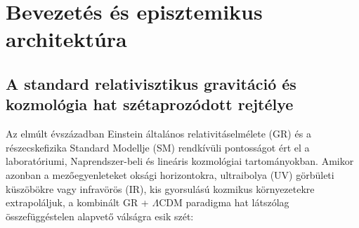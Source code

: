 \documentclass[11pt,a4paper]{article}
\theoremstyle{remark}
\begin{document}
\begin{abstract}
\textbf{(D5)} A lok\'alis $S_4(\sigma)\times S_4(\sigma')$ lap-m\'ert\'ekz\'ar az $\ell_* = \sqrt{24\pi}\,\ell_P$ szimplici\'alis v\'ag\'as\'u horizontra korl\'atozza a direktor-m\'odusokat, $S_H/k_B = 6\pi(A_H/\ell_*^2)$ ($18.85\,k_B$/plakett) entr\'opi\'at, $r_+ = 3\ell_*$-n\'el tet\H{o}z\H{o} ($T_{H,\max} = 2.89 \times 10^{29}\;\mathrm{K}$), majd $C_{\mathrm{BH}} > 0$ pozit\'iv h\H{o}kapacit\'assal $T_H = 0\;\mathrm{K}$-ig h\H{u}l\H{o} extrem\'alis $K_4$ cs\'ira-maradv\'anyt ($r_{\mathrm{ext}} = \sqrt{3}\ell_*$, $M_{\mathrm{rem}} = 11.28\,M_P$, $S_{\mathrm{rem}}/k_B = 72\pi^2 \approx 710.61$), $121.08$ nagys\'agrend\H{u} kozmikus entr\'opian\"oveked\'est ($\mathcal{C}_{\mathrm{Weyl}} = 0 \to S_{\mathrm{CH}}(0)/k_B = 2.27 \times 10^{122}$) \'es az elliptikus $-\Delta_A\Phi_{K_4}$ Gauss-k\'enyszer r\'ev\'en unit\'er Page-g\"orb\'et ($D_{OS}^{\mathrm{op}} > 0$) eredm\'enyezve. V\'eg\"ul a $k = 0$ el\H{o}rejelz\'eseket valid\'aljuk az EHT Sgr A* ($0.49\sigma$) \'es M87* ($0.77\sigma$, hal\'o-hat\'ar $\ell_\tau = 3.17\;\mathrm{kpc}$), GW170817, PSR J0737-3039A/B, GW150914, Planck PR3 CMB ($0.06\sigma$), JWST $z = 14.18$, 43 nagy $z$-j\H{u} koronggalaxis ($\Delta\chi^2 = -88.78$ a $\Lambda\mathrm{CDM}$-mel szemben), 15 kozmikus kronom\'eter ($\chi^2/\mathrm{dof} = 0.38$), $18\,983$ \'el\H{o} ESA Euclid DR1 rekord \'es az Eridanus szuper\"uress\'eg ISW-anom\'ali\'aja ($0.43\sigma$) ellen\'eben, szigor\'uan fenntartva a \texttt{NATURE\_\allowbreak LEVEL\_\allowbreak CLOSURE = false} st\'atust.
\end{abstract}

\tableofcontents
\newpage

\section{Bevezet\'es \'es episztemikus architekt\'ura}
\label{sec:intro}

\subsection{A standard relativisztikus gravit\'aci\'o \'es kozmol\'ogia hat sz\'etaproz\'odott rejt\'elye}

Az elm\'ult \'evsz\'azadban Einstein \'altal\'anos relativit\'aselm\'elete (GR) \cite{HawkingEllis1973} \'es a r\'eszecskefizika Standard Modellje (SM) rendk\'iv\"uli pontoss\'agot \'ert el a laborat\'oriumi, Naprendszer-beli \'es line\'aris kozmol\'ogiai tartom\'anyokban. Amikor azonban a mez\H{o}egyenleteket oks\'agi horizontokra, ultraibolya (UV) g\"orb\"uleti k\"usz\"ob\"okre vagy infrav\"or\"os (IR), kis gyorsul\'as\'u kozmikus k\"ornyezetekre extrapol\'aljuk, a kombin\'alt GR + $\Lambda\mathrm{CDM}$ paradigma hat l\'atsz\'olag \"osszef\"ugg\'estelen alapvet\H{o} v\'als\'agra esik sz\'et:
\end{document}
